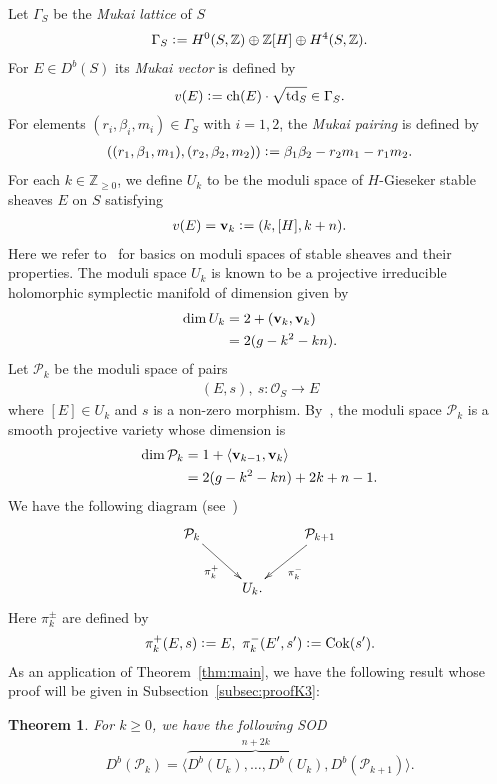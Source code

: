 \documentclass[11pt]{amsart}
\theoremstyle{plain}
\newtheorem{thm}{Theorem}[section]
\newcommand{\oO}{\mathcal{O}}
\newcommand{\pP}{\mathcal{P}}
\newcommand{\ch}{\mathop{\rm ch}\nolimits}
\newcommand{\td}{\mathop{\rm td}\nolimits}
\newcommand{\Cok}{\mathop{\rm Cok}\nolimits}
\begin{document}
Let $\Gamma_S$ be the \textit{Mukai lattice} of $S$
\begin{align*}
\Gamma_S \cneq H^0(S, \mathbb{Z}) \oplus \mathbb{Z}[H] \oplus 
H^4(S, \mathbb{Z}). 
\end{align*}
For $E \in D^b(S)$ 
its \textit{Mukai vector} is defined by
\begin{align*}
v(E) \cneq \ch(E) \cdot \sqrt{\td_S}
 \in \Gamma_S.
\end{align*}
For elements 
$(r_i, \beta_i, m_i) \in \Gamma_S$ with $i=1, 2$, 
the \textit{Mukai pairing} is defined by
\begin{align*}
((r_1, \beta_1, m_1), (r_2, \beta_2, m_2))
 \cneq \beta_1 \beta_2-r_2 m_1 -r_1 m_2.
\end{align*}
For each $k \in \mathbb{Z}_{\ge 0}$, we 
define $U_k$ to be 
the moduli space of $H$-Gieseker stable sheaves
$E$ on $S$
satisfying
\begin{align*}
v(E) =\mathbf{v}_k \cneq (k, [H], k+n). 
\end{align*}
Here we refer to~\cite{HL} for basics on 
moduli spaces of stable sheaves and 
their properties. 
The moduli space $U_k$ is known to be 
a projective 
irreducible holomorphic symplectic manifold of dimension
given by
\begin{align}\notag
\dim U_k &=2+(\mathbf{v}_k, \mathbf{v}_k) \\
\label{dim:Mk}
&= 2(g-k^2-kn).
\end{align}
Let $\pP_k$ be the moduli space of pairs
\begin{align*}
(E, s), \ s \colon \oO_S \to E
\end{align*}
where $[E] \in U_k$ and 
$s$ is a non-zero morphism. 
By~\cite[Lemma~5.117]{KY}, the 
moduli space $\pP_k$ is a smooth projective variety
whose dimension is 
\begin{align}\notag
\dim \pP_k &= 1+\langle \mathbf{v}_{k-1}, \mathbf{v}_k \rangle \\
\label{dim:Pk}
&=2(g-k^2-kn)+2k+n-1.
\end{align}
We have the following diagram (see~\cite[Lemma~5.113]{KY})
\begin{align}\label{dia:P+}
\xymatrix{
\pP_k  \ar[rd]_-{\pi_k^+} & & \ar[ld]^-{\pi_{k}^-} \pP_{k+1} \\
& U_k. &
}
\end{align}
Here $\pi_k^{\pm}$ are defined by
\begin{align*}
\pi_k^+(E, s) \cneq E, \ 
\pi_k^-(E', s') \cneq \Cok(s').
\end{align*}
As an application of Theorem~\ref{thm:main}, 
we have the following result 
whose proof will be given in 
Subsection~\ref{subsec:proofK3}:
\begin{thm}\label{thm:K3}
For $k\ge 0$, we have the following SOD
\begin{align*}
D^b(\pP_k)=\langle \overbrace{D^b(U_k), \ldots, D^b(U_k)}^{n+2k}, D^b(\pP_{k+1}) \rangle.
\end{align*}
\end{thm}
\end{document}
